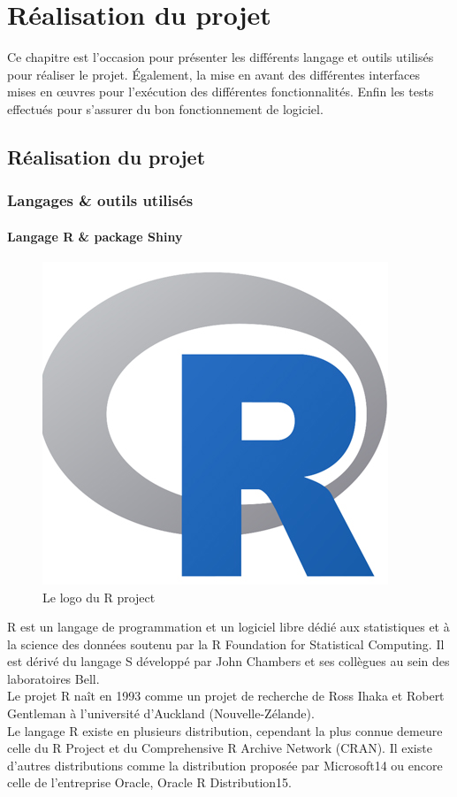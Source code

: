 \chapter{Réalisation du projet}
Ce chapitre est l’occasion pour présenter les différents langage et outils utilisés pour réaliser le projet. Également, la mise en avant des différentes interfaces mises en œuvres pour l’exécution des différentes fonctionnalités. Enfin les tests effectués pour s’assurer du bon fonctionnement de logiciel.

\newpage
\section{Réalisation du projet}
\subsection {Langages \& outils utilisés}
\subsubsection {Langage R \& package Shiny}

\begin{figure}[!h]
	\center
	\includegraphics[scale=0.2]{img/R_logo.png}
	\caption {Le logo du R project}
\end{figure}
R est un langage de programmation et un logiciel libre dédié aux statistiques et à la science des données soutenu par la R Foundation for Statistical Computing. Il est dérivé du langage S développé par John Chambers et ses collègues au sein des laboratoires Bell.\\
Le projet R naît en 1993 comme un projet de recherche de Ross Ihaka et Robert Gentleman à l'université d'Auckland (Nouvelle-Zélande). \\
Le langage R existe en plusieurs distribution, cependant la plus connue demeure celle du R Project et du Comprehensive R Archive Network (CRAN). Il existe d'autres distributions comme la distribution proposée par Microsoft14 ou encore celle de l'entreprise Oracle, Oracle R Distribution15.\\

